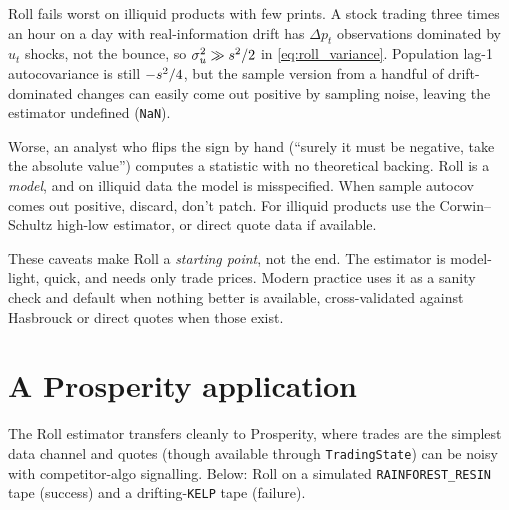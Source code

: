 \begin{pitfallbox}
Roll fails worst on illiquid products with few prints. A stock
trading three times an hour on a day with real-information drift
has $\Delta p_t$ observations dominated by $u_t$ shocks, not the
bounce, so $\sigma_u^2 \gg s^2/2$ in
\cref{eq:roll_variance}. Population lag-1 autocovariance is still
$-s^2/4$, but the sample version from a handful of
drift-dominated changes can easily come out positive by sampling
noise, leaving the estimator undefined (\texttt{NaN}).

Worse, an analyst who flips the sign by hand (``surely it must
be negative, take the absolute value'') computes a statistic
with no theoretical backing. Roll is a \emph{model}, and on
illiquid data the model is misspecified. When sample autocov comes
out positive, discard, don't patch. For illiquid products use the
Corwin--Schultz high-low estimator, or direct quote data if
available.
\end{pitfallbox}

These caveats make Roll a \emph{starting point}, not the end. The
estimator is model-light, quick, and needs only trade prices. Modern practice
uses it as a sanity check and default when nothing better is
available, cross-validated against Hasbrouck or direct quotes when
those exist.

\section{A Prosperity application}
\label{sec:roll_prosperity}

The Roll estimator transfers cleanly to Prosperity, where trades
are the simplest data channel and quotes (though available through
\texttt{TradingState}) can be noisy with competitor-algo signalling.
Below: Roll on a simulated \texttt{RAINFOREST\_RESIN} tape (success)
and a drifting-\texttt{KELP} tape (failure).

